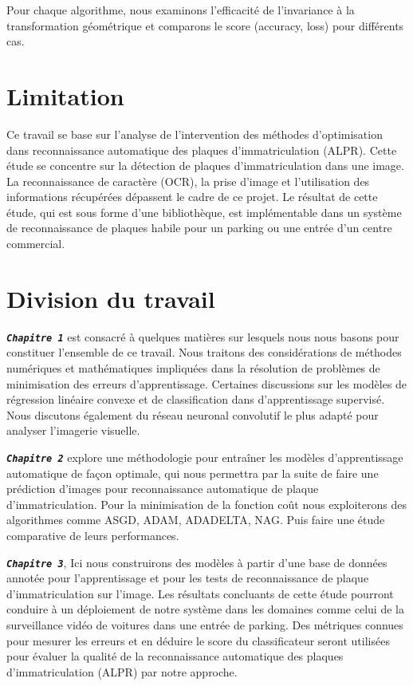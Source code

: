 		Pour chaque algorithme, nous examinons l'efficacité de l’invariance à la transformation géométrique et comparons le score (accuracy, loss) pour différents cas.
		
	\section{Limitation}
		Ce travail se base sur l’analyse de l’intervention des méthodes d’optimisation dans reconnaissance automatique des plaques d’immatriculation (ALPR). 
		Cette étude se concentre sur la détection de plaques d’immatriculation dans une image. La reconnaissance de caractère (OCR), la prise d’image et l'utilisation des informations récupérées dépassent le cadre de ce projet.
		Le résultat de cette étude, qui est sous forme d’une bibliothèque, est implémentable dans un système de reconnaissance de plaques habile pour un parking ou une entrée d’un centre commercial.
	
	\section{Division du travail}
		
		\begin{list}{}{En dehors de cette introduction, la partie conclusive et l'annexe, ce mémoire est organisé en trois chapitres comme suit.}
			\item \textbf{\textsl{\texttt{Chapitre 1}}} est consacré à quelques matières sur lesquels nous nous basons pour constituer l'ensemble de ce travail.  Nous traitons des considérations de méthodes numériques et mathématiques impliquées dans la résolution de problèmes de minimisation des erreurs d’apprentissage. Certaines discussions sur les modèles de régression linéaire convexe et de classification dans d’apprentissage supervisé. Nous discutons également du réseau neuronal convolutif le plus adapté pour analyser l'imagerie visuelle.
			
			\item \textbf{\textsl{\texttt{Chapitre 2}}}  explore une méthodologie pour entraîner les modèles d’apprentissage automatique de façon optimale, qui nous permettra par la suite de faire une prédiction d’images pour reconnaissance automatique de plaque d'immatriculation. Pour la minimisation de la fonction coût nous exploiterons des algorithmes comme ASGD, ADAM, ADADELTA, NAG. Puis faire une étude comparative de leurs performances.
			
			\item \textbf{\textsl{\texttt{Chapitre 3}}}, Ici nous construirons des modèles à partir d’une base de données annotée pour l'apprentissage et pour les tests de reconnaissance  de plaque d'immatriculation sur l’image. Les résultats concluants de cette étude pourront conduire à un déploiement de notre système dans les domaines comme  celui de la surveillance vidéo de voitures dans une entrée de parking. Des métriques connues pour mesurer les erreurs et en déduire le score du classificateur seront utilisées pour évaluer la qualité de la reconnaissance automatique des plaques d’immatriculation (ALPR) par notre approche.
			
		\end{list}
	
	

		
		
		
		